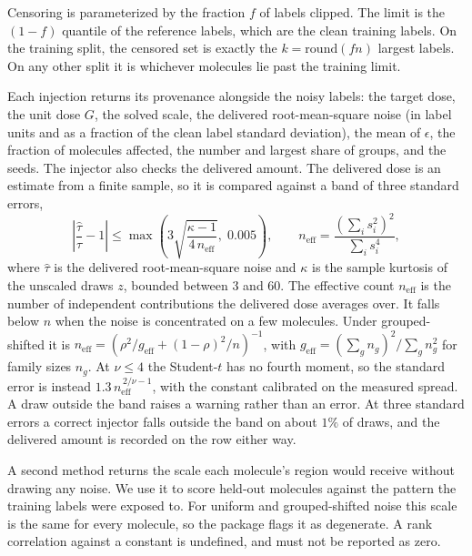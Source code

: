 Censoring is parameterized by the fraction $f$ of labels clipped. The limit is the $(1-f)$ quantile
of the reference labels, which are the clean training labels. On the training split, the censored
set is exactly the $k = \mathrm{round}(fn)$ largest labels. On any other split it is whichever
molecules lie past the training limit.

Each injection returns its provenance alongside the noisy labels: the target dose, the unit dose
$G$, the solved scale, the delivered root-mean-square noise (in label units and as a fraction of the
clean label standard deviation), the mean of $\epsilon$, the fraction of molecules affected, the
number and largest share of groups, and the seeds. The injector also checks the delivered amount.
The delivered dose is an estimate from a finite sample, so it is compared against a band of three
standard errors,
\begin{equation}
\left|\frac{\hat{\tau}}{\tau} - 1\right| \le \max\!\left(3\sqrt{\frac{\kappa - 1}{4\,n_{\mathrm{eff}}}},\; 0.005\right),
\qquad
n_{\mathrm{eff}} = \frac{\left(\sum_i s_i^2\right)^2}{\sum_i s_i^4},
\label{eq:dose_tolerance}
\end{equation}
where $\hat{\tau}$ is the delivered root-mean-square noise and $\kappa$ is the sample kurtosis of the
unscaled draws $z$, bounded between 3 and 60. The effective count $n_{\mathrm{eff}}$ is the number of
independent contributions the delivered dose averages over. It falls below $n$ when the noise is
concentrated on a few molecules. Under grouped-shifted it is
$n_{\mathrm{eff}} = \left(\rho^2/g_{\mathrm{eff}} + (1-\rho)^2/n\right)^{-1}$, with
$g_{\mathrm{eff}} = \left(\sum_g n_g\right)^2 / \sum_g n_g^2$ for family sizes $n_g$. At
$\nu \le 4$ the Student-$t$ has no fourth moment, so the standard error is instead
$1.3\,n_{\mathrm{eff}}^{\,2/\nu - 1}$, with the constant calibrated on the measured spread. A draw
outside the band raises a warning rather than an error. At three standard errors a correct injector
falls outside the band on about $1\%$ of draws, and the delivered amount is recorded on the row
either way.

A second method returns the scale each molecule's region would receive without drawing any noise.
We use it to score held-out molecules against the pattern the training labels were exposed to. For
uniform and grouped-shifted noise this scale is the same for every molecule, so the package flags it
as degenerate. A rank correlation against a constant is undefined, and must not be reported as zero.

